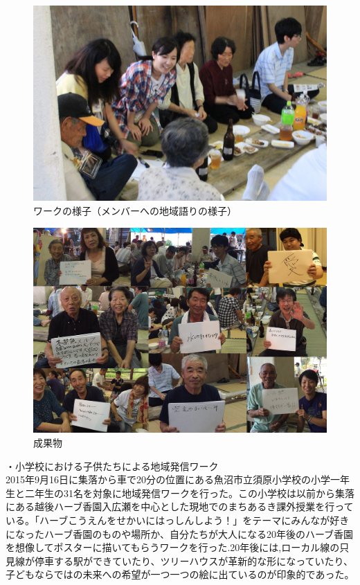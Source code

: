 \documentclass[a4paper]{jsarticle}
\begin{document}
\begin{figure}[H]
  \begin{center}
    \includegraphics[width=0.8\hsize]{./images/IMG_4784.JPG}
    \caption{ワークの様子（メンバーへの地域語りの様子）}
    \label{fig:tmu_hino}
  \end{center}
\end{figure}
\begin{figure}[H]
  \begin{center}
    \includegraphics[width=0.8\hsize]{./images/yokone.png}
    \caption{成果物}
    \label{fig:tmu_hino}
  \end{center}
\end{figure}


・小学校における子供たちによる地域発信ワーク\\
2015年9月16日に集落から車で20分の位置にある魚沼市立須原小学校の小学一年生と二年生の31名を対象に地域発信ワークを行った。この小学校は以前から集落にある越後ハーブ香園入広瀬を中心とした現地でのまちあるき課外授業を行っている。「ハーブこうえんをせかいにはっしんしよう！」をテーマにみんなが好きになったハーブ香園のものや場所か、自分たちが大人になる20年後のハーブ香園を想像してポスターに描いてもらうワークを行った.20年後には,ローカル線の只見線が停車する駅ができていたり、ツリーハウスが革新的な形になっていたり、子どもならではの未来への希望が一つ一つの絵に出ているのが印象的であった。
\end{document}
